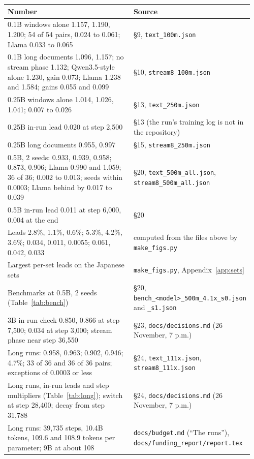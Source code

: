 \documentclass[10pt,twocolumn,letterpaper]{article}
\newcommand{\sect}[1]{\S#1}
\begin{document}
\small\sloppy
\begin{longtable}{@{}>{\raggedright\arraybackslash}p{0.56\linewidth} >{\raggedright\arraybackslash}p{0.40\linewidth}@{}}
\toprule
Number & Source \\
\midrule
\endhead
\bottomrule
\endfoot
0.1B windows alone 1.157, 1.190, 1.200; 54 of 54 pairs, 0.024 to 0.061; Llama 0.033 to 0.065 & \sect{9}, \texttt{text\_100m.json} \\
0.1B long documents 1.096, 1.157; no stream phase 1.132; Qwen3.5-style alone 1.230, gain 0.073; Llama 1.238 and 1.584; gains 0.055 and 0.099 & \sect{10}, \texttt{stream8\_100m.json} \\
0.25B windows alone 1.014, 1.026, 1.041; 0.007 to 0.026 & \sect{13}, \texttt{text\_250m.json} \\
0.25B in-run lead 0.020 at step 2,500 & \sect{13} (the run's training log is not in the repository) \\
0.25B long documents 0.955, 0.997 & \sect{15}, \texttt{stream8\_250m.json} \\
0.5B, 2 seeds: 0.933, 0.939, 0.958; 0.873, 0.906; Llama 0.990 and 1.059; 36 of 36; 0.002 to 0.013; seeds within 0.0003; Llama behind by 0.017 to 0.039 & \sect{20}, \texttt{text\_500m\_all.json}, \texttt{stream8\_500m\_all.json} \\
0.5B in-run lead 0.011 at step 6,000, 0.004 at the end & \sect{20} \\
Leads 2.8\%, 1.1\%, 0.6\%; 5.3\%, 4.2\%, 3.6\%; 0.034, 0.011, 0.0055; 0.061, 0.042, 0.033 & computed from the files above by \texttt{make\_figs.py} \\
Largest per-set leads on the Japanese sets & \texttt{make\_figs.py}, Appendix~\ref{app:sets} \\
Benchmarks at 0.5B, 2 seeds (Table~\ref{tab:bench}) & \sect{20}, \texttt{bench\_<model>\_500m\_4.1x\_s0.json} and \texttt{\_s1.json} \\
3B in-run check 0.850, 0.866 at step 7,500; 0.034 at step 3,000; stream phase near step 36,550 & \sect{23}, \texttt{docs/decisions.md} (26 November, 7 p.m.) \\
Long runs: 0.958, 0.963; 0.902, 0.946; 4.7\%; 33 of 36 and 36 of 36 pairs; exceptions of 0.0003 or less & \sect{24}, \texttt{text\_111x.json}, \texttt{stream8\_111x.json} \\
Long runs, in-run leads and step multipliers (Table~\ref{tab:long}); switch at step 28,400; decay from step 31,788 & \sect{24}, \texttt{docs/decisions.md} (26 November, 7 p.m.) \\
Long runs: 39,735 steps, 10.4B tokens, 109.6 and 108.9 tokens per parameter; 9B at about 108 & \texttt{docs/budget.md} (``The runs''), \texttt{docs/funding\_report/report.tex} \\

\end{longtable}
\end{document}
